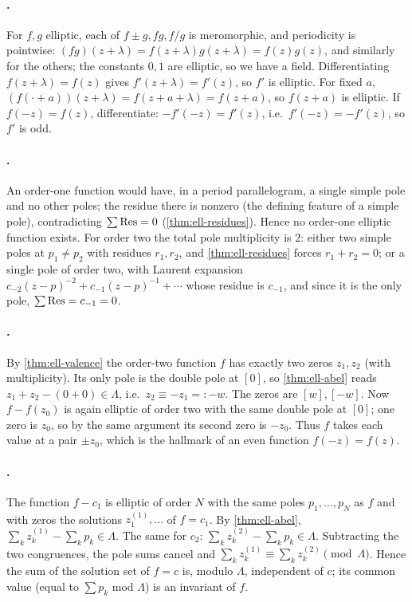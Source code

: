 \paragraph{.}
For \(f, g\) elliptic, each of \(f \pm g, fg, f/g\) is meromorphic, and
periodicity is pointwise: \((fg)(z+\lambda) = f(z+\lambda)g(z+\lambda) =
f(z)g(z)\), and similarly for the others; the constants \(0, 1\) are elliptic, so
we have a field. Differentiating \(f(z+\lambda) = f(z)\) gives
\(f'(z+\lambda) = f'(z)\), so \(f'\) is elliptic. For fixed \(a\), \((f(\cdot+a))
(z+\lambda) = f(z+a+\lambda) = f(z+a)\), so \(f(z+a)\) is elliptic. If
\(f(-z) = f(z)\), differentiate: \(-f'(-z) = f'(z)\), i.e.\ \(f'(-z) = -f'(z)\),
so \(f'\) is odd.

\paragraph{.}
An order-one function would have, in a period parallelogram, a single simple
pole and no other poles; the residue there is nonzero (the defining feature of a
simple pole), contradicting \(\sum \operatorname{Res} = 0\) (\cref{thm:ell-residues}). Hence no
order-one elliptic function exists. For order two the total pole multiplicity is
\(2\): either two simple poles at \(p_1 \ne p_2\) with residues \(r_1, r_2\), and
\cref{thm:ell-residues} forces \(r_1 + r_2 = 0\); or a single pole of order two,
with Laurent expansion \(c_{-2}(z-p)^{-2} + c_{-1}(z-p)^{-1} + \cdots\) whose
residue is \(c_{-1}\), and since it is the only pole, \(\sum\operatorname{Res} = c_{-1} = 0\).

\paragraph{.}
By \cref{thm:ell-valence} the order-two function \(f\) has exactly two zeros
\(z_1, z_2\) (with multiplicity). Its only pole is the double pole at \([0]\), so
\cref{thm:ell-abel} reads \(z_1 + z_2 - (0 + 0) \in \Lambda\), i.e.\
\(z_2 \equiv -z_1 =: -w\). The zeros are \([w], [-w]\). Now \(f - f(z_0)\) is
again elliptic of order two with the same double pole at \([0]\); one zero is
\(z_0\), so by the same argument its second zero is \(-z_0\). Thus \(f\) takes
each value at a pair \(\pm z_0\), which is the hallmark of an even function
\(f(-z) = f(z)\).

\paragraph{.}
The function \(f - c_1\) is elliptic of order \(N\) with the same poles
\(p_1, \dots, p_N\) as \(f\) and with zeros the solutions \(z_1^{(1)}, \dots\) of
\(f = c_1\). By \cref{thm:ell-abel}, \(\sum_k z_k^{(1)} - \sum_k p_k \in
\Lambda\). The same for \(c_2\): \(\sum_k z_k^{(2)} - \sum_k p_k \in \Lambda\).
Subtracting the two congruences, the pole sums cancel and
\(\sum_k z_k^{(1)} \equiv \sum_k z_k^{(2)} \pmod \Lambda\). Hence the sum of the
solution set of \(f = c\) is, modulo \(\Lambda\), independent of \(c\); its common
value (equal to \(\sum p_k\) mod \(\Lambda\)) is an invariant of \(f\).

